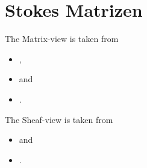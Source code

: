 \chapter{Stokes Matrizen}
\begin{comment}
Matrizen Sicht:
\begin{itemize}
  \item \cite[Chapter 3]{boalch}
    \\ largely following:
    \begin{itemize}
      \item[\textbf{8}] D.G. Babbitt and V.S. Varadarajan.
      \textbf{Formal reduction theory of meromorphic differential equations: a
        group theoretic view.}
      \texttt{euclid.pjm.1102720203.pdf}
      \item[\textbf{11}] W. Balser, W.B. Jurkat, and D.A. Lutz.
      \textbf{Birkhoff invariants and Stokes’ multipliers for meromorphic
        linear differential equations.}
      \item[\textbf{40}] M. Jimbo, T. Miwa, and Kimio Ueno.
      \textbf{Monodromy preserving deformations of linear differential
        equations with rational coefficients I.}
      \item[\textbf{43}] M. Loday-Richaud
      \textbf{Stokes phenomenon, multisummability and differential Galois
        groups.}
      \item[\textbf{50}] J. Martinet and J.P. Ramis.
      \textbf{Elementary acceleration and multisummability.}
    \end{itemize}
  \item \cite{thboalch}
  \item Marius van der Put, Kyoshi Saito => Diff.Galois Theory
\end{itemize}
Moderne Sicht:
\begin{itemize}
  \item Malgrange
  \item \cite{sabbah2007isomonodromic}
\end{itemize}
\end{comment}

\begin{paracol}{2}
  The Matrix-view is taken from 
  \begin{itemize}
    \item \cite{boalch},
    \item \cite{thboalch} and
    \item \cite{van2003galois}.
  \end{itemize}
  \switchcolumn{}
  The Sheaf-view is taken from
  \begin{itemize}
    \item \cite{sabbah_cimpa90} and
    \item \cite{sabbah2007isomonodromic}.
  \end{itemize}
\end{paracol}

